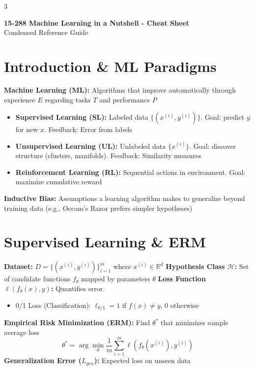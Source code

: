 \documentclass[8pt,landscape]{extarticle}
\begin{document}
\begin{multicols*}{3}

\begin{center}
    \Large \textbf{15-288 Machine Learning in a Nutshell - Cheat Sheet} \\
    \footnotesize Condensed Reference Guide
\end{center}

\section{Introduction \& ML Paradigms}
\textbf{Machine Learning (ML):} Algorithms that improve automatically through experience $E$ regarding tasks $T$ and performance $P$ %
\begin{itemize}
    \item \textbf{Supervised Learning (SL):} Labeled data $\{(x^{(i)}, y^{(i)})\}$. Goal: predict $y$ for new $x$. Feedback: Error from labels %
    \item \textbf{Unsupervised Learning (UL):} Unlabeled data $\{x^{(i)}\}$. Goal: discover structure (clusters, manifolds). Feedback: Similarity measures %
    \item \textbf{Reinforcement Learning (RL):} Sequential actions in environment. Goal: maximize cumulative reward %
\end{itemize}
\textbf{Inductive Bias:} Assumptions a learning algorithm makes to generalize beyond training data (e.g., Occam's Razor prefers simpler hypotheses) %

\section{Supervised Learning \& ERM}
\textbf{Dataset:} $D = \{(x^{(i)}, y^{(i)})\}_{i=1}^{m}$ where $x^{(i)} \in \mathbb{R}^d$ %
\textbf{Hypothesis Class $\mathcal{H}$:} Set of candidate functions $f_\theta$ mapped by parameters $\theta$ %
\textbf{Loss Function $\ell(f_\theta(x), y)$:} Quantifies error.
\begin{itemize}
    \item 0/1 Loss (Classification): $\ell_{0/1} = 1$ if $f(x) \neq y$, $0$ otherwise %
\end{itemize}
\textbf{Empirical Risk Minimization (ERM):} Find $\theta^*$ that minimizes sample average loss %
$$ \theta^* = \arg\min_\theta \frac{1}{m} \sum_{i=1}^m \ell(f_\theta(x^{(i)}), y^{(i)}) $$ %
\textbf{Generalization Error ($L_{gen}$):} Expected loss on unseen data %


\end{multicols*}
\end{document}
